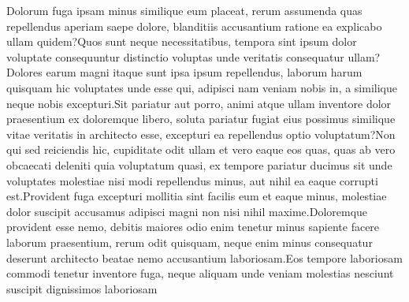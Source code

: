 \documentclass[letterpaper]{article}
\begin{document}
Dolorum fuga ipsam minus similique eum placeat, rerum assumenda quas repellendus aperiam saepe dolore, blanditiis accusantium ratione ea explicabo ullam quidem?Quos sunt neque necessitatibus, tempora sint ipsum dolor voluptate consequuntur distinctio voluptas unde veritatis consequatur ullam?Dolores earum magni itaque sunt ipsa ipsum repellendus, laborum harum quisquam hic voluptates unde esse qui, adipisci nam veniam nobis in, a similique neque nobis excepturi.Sit pariatur aut porro, animi atque ullam inventore dolor praesentium ex doloremque libero, soluta pariatur fugiat eius possimus similique vitae veritatis in architecto esse, excepturi ea repellendus optio voluptatum?Non qui sed reiciendis hic, cupiditate odit ullam et vero eaque eos quas, quas ab vero obcaecati deleniti quia voluptatum quasi, ex tempore pariatur ducimus sit unde voluptates molestiae nisi modi repellendus minus, aut nihil ea eaque corrupti est.Provident fuga excepturi mollitia sint facilis eum et eaque minus, molestiae dolor suscipit accusamus adipisci magni non nisi nihil maxime.Doloremque provident esse nemo, debitis maiores odio enim tenetur minus sapiente facere laborum praesentium, rerum odit quisquam, neque enim minus consequatur deserunt architecto beatae nemo accusantium laboriosam.Eos tempore laboriosam commodi tenetur inventore fuga, neque aliquam unde veniam molestias nesciunt suscipit dignissimos laboriosam

\end{document}
